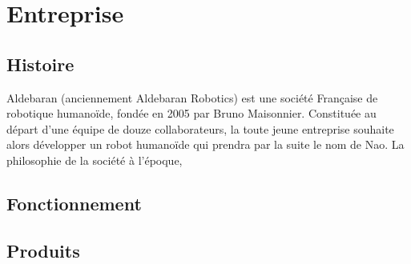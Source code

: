 \chapter*{Entreprise}
\label{Entreprise}
\thispagestyle{fancy}

\section{Histoire}
\label{Entreprise: histoire}
Aldebaran (anciennement Aldebaran Robotics) est une société Française de robotique humanoïde, fondée en 2005 par Bruno Maisonnier. 
Constituée au départ d'une équipe de douze collaborateurs, la toute jeune entreprise souhaite alors développer un robot humanoïde qui prendra par la suite le nom de Nao. La philosophie de la société à l'époque,

\section{Fonctionnement}

\section{Produits}
